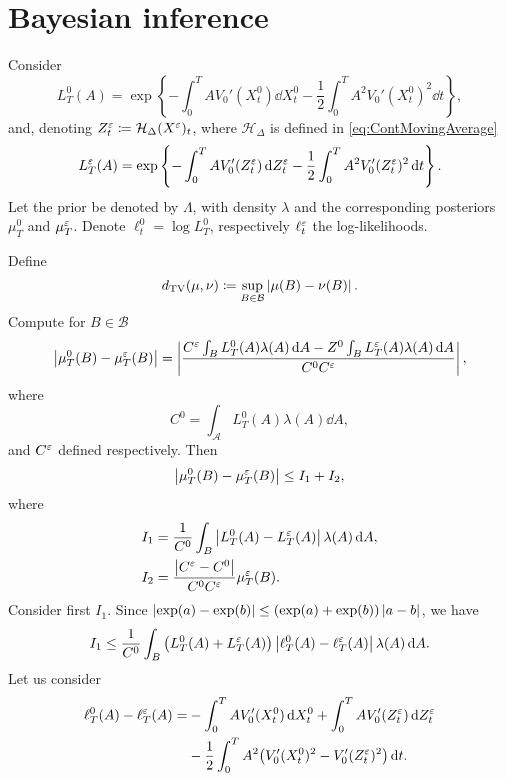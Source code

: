 \documentclass[10pt]{article}
\begin{document}
\section{Bayesian inference}

Consider 
\begin{equation}
L_T^0(A) = \exp\left\{-\int_0^T A V_0'(X_t^0) \dd X_t^0 - \frac12 \int_0^T A^2 V_0'(X_t^0)^2 \dd t \right\},
\end{equation}
and, denoting $Z^\varepsilon_t \coloneqq \mathcal H_\Delta(X^\varepsilon)_t$, where $\mathcal H_\Delta$ is defined in \eqref{eq:ContMovingAverage}
\begin{equation}
L_T^\varepsilon(A) = \exp\left\{-\int_0^T A V_0'(Z^\varepsilon_t)\,\mathrm{d} Z^\varepsilon_t - \frac12 \int_0^T A^2 V_0'(Z^\varepsilon_t)^2 \,\mathrm{d} t \right\}.
\end{equation}
Let the prior be denoted by $\Lambda$, with density $\lambda$ and the corresponding posteriors $\mu_T^0$ and $\mu_T^\varepsilon$. Denote $\ell_t^0 = \log L_T^0$, respectively $\ell_t^\varepsilon$ the log-likelihoods.

Define 
\begin{equation}
d_{\mathrm{TV}}(\mu, \nu) \coloneqq \sup_{B \in \mathcal B} \left\lvert\mu(B) - \nu(B)\right\rvert.
\end{equation}
Compute for $B \in \mathcal B$ 
\begin{equation}
\left\lvert\mu_T^0(B) - \mu_T^\varepsilon(B)\right\rvert = \left\lvert\frac{C^\varepsilon \int_B L_T^0(A) \lambda(A) \,\mathrm{d} A - Z^0 \int_B L_T^\varepsilon(A) \lambda(A) \,\mathrm{d} A}{C^0 C^\varepsilon}\right\rvert,
\end{equation}
where
\begin{equation}
C^0 = \int_{\mathcal A} L_T^0(A) \lambda(A) \dd A,
\end{equation}
and $C^\varepsilon$ defined respectively. Then
\begin{equation}
\left\lvert\mu_T^0(B) - \mu_T^\varepsilon(B)\right\rvert \leq I_1 + I_2, 
\end{equation}
where
\begin{equation}
\begin{aligned}
I_1 &= \frac{1}{C^0} \int_B \left\lvert L_T^0(A) - L_T^\varepsilon(A)\right\rvert \lambda(A) \,\mathrm{d} A, \\
I_2 &= \frac{\left\lvert C^\varepsilon - C^0\right\rvert}{C^0 C^\varepsilon} \mu_T^\varepsilon(B).
\end{aligned}
\end{equation}
Consider first $I_1$. Since $\left\lvert\exp(a) - \exp(b)\right\rvert \leq (\exp(a)+ \exp(b)) \left\lvert a - b\right\rvert$, we have
\begin{equation}
I_1 \leq \frac{1}{C^0} \int_B \big(L_T^0(A) + L_T^\varepsilon(A)\big)\left\lvert\ell_T^0(A) - \ell_T^\varepsilon(A)\right\rvert \lambda(A) \,\mathrm{d} A.
\end{equation}
Let us consider
\begin{equation}
\begin{aligned}
\ell_T^0(A) - \ell_T^\varepsilon(A) = &- \int_0^T A V_0'(X_t^0) \,\mathrm{d} X_t^0 + \int_0^T A V_0'(Z^\varepsilon_t) \,\mathrm{d} Z^\varepsilon_t \\
&- \frac12 \int_0^T A^2 \big(V_0'(X_t^0)^2 - V_0'(Z^\varepsilon_t)^2\big) \,\mathrm{d} t.
\end{aligned}
\end{equation}
\end{document}
